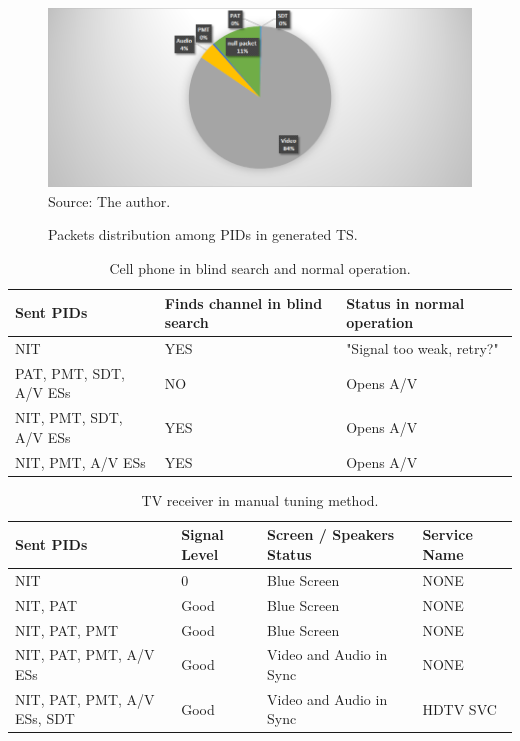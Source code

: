 \documentclass[12pt,a4paper]{article}
\begin{document}
\begin{figure}[!h]
\centering
\caption{Packets distribution among PIDs in generated TS.}
\includegraphics[width=0.9\linewidth]{pictures/graph_generated_dump.png}
\\Source: The author.
\label{fig:graph_generated_dump}
\end{figure}

\begin{table}
    \caption {Cell phone in blind search and normal operation.}
    \begin{center}
\begin{tabular}{|l|l|l|}
    \hline
    Sent PIDs              & Finds channel in blind search & Status in normal operation \\ \hline
    NIT                    & YES                           & "Signal too weak, retry?"  \\ \hline
    PAT, PMT, SDT, A/V ESs & NO                            & Opens A/V                  \\ \hline
    NIT, PMT, SDT, A/V ESs & YES                           & Opens A/V                  \\ \hline
    NIT, PMT, A/V ESs      & YES                           & Opens A/V                  \\ \hline
    \end{tabular}
	\label{tab_cell}
\end{center}
\end{table}

\begin{table}
    \caption {TV receiver in manual tuning method.}
    \begin{center}
\begin{tabular}{|l|l|l|l|}
    \hline
    Sent PIDs                   & Signal Level & Screen / Speakers Status & Service Name \\ \hline
    NIT                         & 0            & Blue Screen              & NONE         \\ \hline
    NIT, PAT                    & Good         & Blue Screen              & NONE         \\ \hline
    NIT, PAT, PMT               & Good         & Blue Screen              & NONE         \\ \hline
    NIT, PAT, PMT, A/V ESs      & Good         & Video and Audio in Sync  & NONE         \\ \hline
    NIT, PAT, PMT, A/V ESs, SDT & Good         & Video and Audio in Sync  & HDTV SVC \\ \hline
    \end{tabular}
	\label{tab_manual_tuning}
\end{center}
\end{table}
\end{document}

